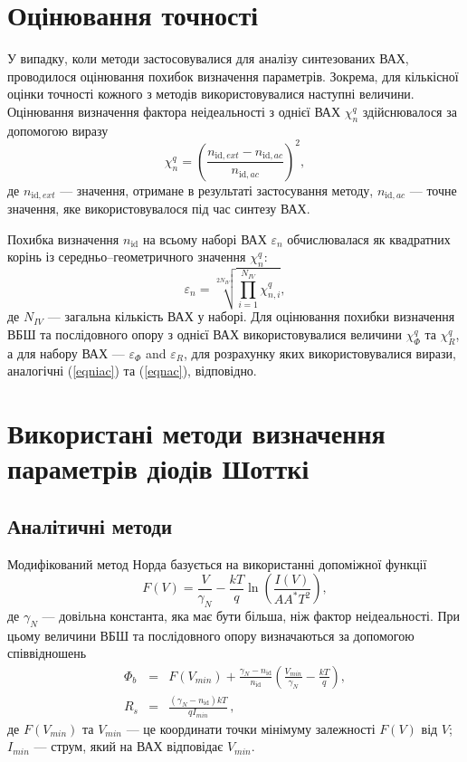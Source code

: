 \section{Оцінювання точності}
У випадку, коли методи застосовувалися для аналізу синтезованих ВАХ, проводилося оцінювання похибок визначення параметрів.
Зокрема, для кількісної оцінки точності кожного з методів використовувалися наступні величини.
Оцінювання визначення фактора неідеальності з однієї ВАХ $\chi^q_n$ здійснювалося за допомогою виразу
\begin{equation}
\label{eqniac}
\chi^q_n=\left(\frac{n_{\mathrm{id},ext}-n_{\mathrm{id},ac}}{n_{\mathrm{id},ac}}\right)^2,
\end{equation}
де
$n_{\mathrm{id},ext}$ --- значення, отримане в результаті застосування методу,
$n_{\mathrm{id},ac}$ --- точне значення, яке використовувалося під час синтезу ВАХ.


Похибка визначення $n_\mathrm{id}$ на всьому наборі ВАХ $\varepsilon_n$ обчислювалася  як квадратних корінь із середньо--геометричного значення $\chi^q_n$:
\begin{equation}
\label{eqnac}
\varepsilon_n=\sqrt[2N_{I\!V}]{\prod_{i=1}^{N_{I\!V}}\chi^q_{n,i}},
\end{equation}
де
$N_{I\!V}$ --- загальна кількість ВАХ у наборі.
Для оцінювання похибки визначення ВБШ та послідовного опору з однієї ВАХ використовувалися величини  $\chi^q_\Phi$ та $\chi^q_R$, а для набору ВАХ --- $\varepsilon_\Phi$ and $\varepsilon_R$, для розрахунку яких використовувалися вирази, аналогічні (\ref{eqniac}) та (\ref{eqnac}), відповідно.

\section{Використані методи визначення параметрів діодів Шотткі}
\subsection{Аналітичні методи\label{AnMethod}}
Модифікований метод Норда \cite{Norde,Lien,Sato,Dermircioglu:Norde} базується на використанні допоміжної функції
\begin{equation}
\label{eqNorde}
F(V)=\frac{V}{\gamma_N}-\frac{kT}{q}\ln\left(\frac{I(V)}{AA^*T^2}\right),
\end{equation}
де
$\gamma_N$ --- довільна константа, яка має бути більша, ніж фактор неідеальності.
При цьому величини ВБШ та послідовного опору визначаються за допомогою співвідношень
\begin{eqnarray}
\label{eqNordDet}
\Phi_b&=&F(V_{min})+\frac{\gamma_N-n_\mathrm{id}}{n_\mathrm{id}}\left(\frac{V_{min}}{\gamma_N}-\frac{kT}{q}\right),
\\
R_s&=&\frac{(\gamma_N-n_\mathrm{id})kT}{qI_{min}}\,,
\end{eqnarray}
де
$F(V_{min})$ та $V_{min}$ --- це координати точки мінімуму залежності $F(V)$ від $V$;
$I_{min}$  --- струм, який на ВАХ відповідає $V_{min}$.

